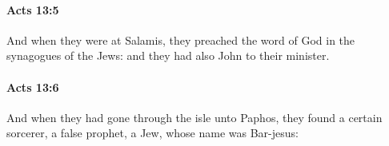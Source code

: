 		\paragraph{Acts 13:5} %
			\label{ACTS-13-5}

			And when they were at Salamis, they preached the word of God in the synagogues of the Jews: and they had also John to their minister.

			\begin{framed}
			\scriptsize
				\begin{compactdesc}
					\item[SBLG] 
				\end{compactdesc}
			\end{framed}

		\paragraph{Acts 13:6} %
			\label{ACTS-13-6}

			And when they had gone through the isle unto Paphos, they found a certain sorcerer, a false prophet, a Jew, whose name was Bar-jesus:

